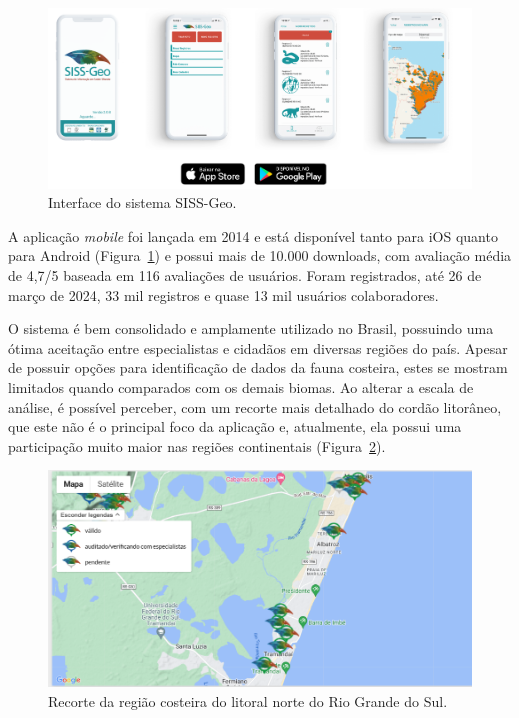 \begin{figure}[htb]
  \centering
  \includegraphics[width=1\textwidth]{imagens/sisGeoApp.png}
  \caption{Interface do sistema SISS-Geo.}
  \label{fig:sisgeoApp}
\end{figure}

A aplicação \textit{mobile} foi lançada em 2014 e está disponível tanto para iOS quanto para Android (Figura~\ref{fig:sisgeoApp}) e possui mais de 10.000 downloads, com avaliação média de 4,7/5 baseada em 116 avaliações de usuários. Foram registrados, até 26 de março de 2024, 33 mil registros e quase 13 mil usuários colaboradores.

O sistema é bem consolidado e amplamente utilizado no Brasil, possuindo uma ótima aceitação entre especialistas e cidadãos em diversas regiões do país. Apesar de possuir opções para identificação de dados da fauna costeira, estes se mostram limitados quando comparados com os demais biomas. Ao alterar a escala de análise, é possível perceber, com um recorte mais detalhado do cordão litorâneo, que este não é o principal foco da aplicação e, atualmente, ela possui uma participação muito maior nas regiões continentais (Figura~\ref{fig:sisgeoMap}).

\begin{figure}[htb]
  \centering
  \includegraphics[width=1\textwidth]{imagens/sisGeoMapa.png}
  \caption{Recorte da região costeira do litoral norte do Rio Grande do Sul.}
  \label{fig:sisgeoMap}
\end{figure}

